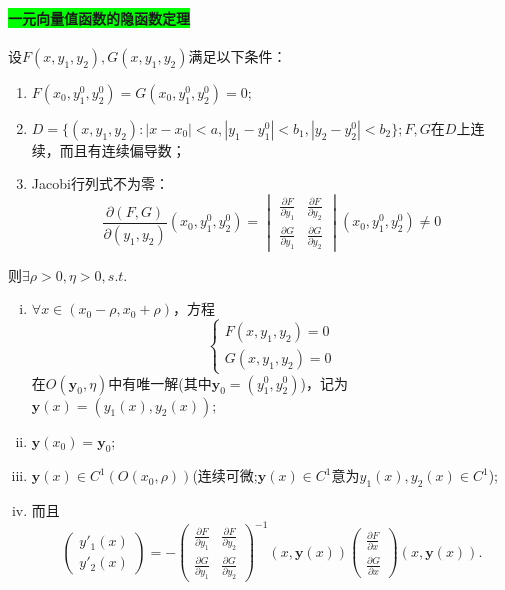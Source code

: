 \documentclass[UTF8]{ctexart}
\begin{document}
        \paragraph{\colorbox{lime}{一元向量值函数的隐函数定理}}设$F(x,y_1,y_2),G(x,y_1,y_2)$满足以下条件：
        \begin{enumerate}[(1)]
            \item $F(x_0,y_1^0,y_2^0)=G(x_0,y_1^0,y_2^0)=0$;
            \item $D=\{(x,y_1,y_2):|x-x_0|<a,|y_1-y_1^0|<b_1,|y_2-y_2^0|<b_2\};F,G$在$D$上连续，而且有连续偏导数；
            \item Jacobi行列式不为零：$$\frac{\partial(F,G)}{\partial(y_1,y_2)}(x_0,y_1^0,y_2^0)=\begin{vmatrix}
                \frac{\partial F}{\partial y_1} & \frac{\partial F}{\partial y_2}\\
                \frac{\partial G}{\partial y_1} & \frac{\partial G}{\partial y_2}
            \end{vmatrix}(x_0,y_1^0,y_2^0)\not=0$$
        \end{enumerate}
        则$\exists\rho>0,\eta>0,s.t.$
        \begin{enumerate}[(i)]
            \item $\forall x\in(x_0-\rho,x_0+\rho)$，方程
            $$\begin{cases}
                F(x,y_1,y_2)=0\\
                G(x,y_1,y_2)=0
            \end{cases}$$
            在$O(\boldsymbol{y}_0,\eta)$中有唯一解(其中$\boldsymbol{y}_0=(y_1^0,y_2^0)$)，记为$\boldsymbol{y}(x)=(y_1(x),y_2(x))$;
            \item $\boldsymbol{y}(x_0)=\boldsymbol{y}_0$;
            \item $\boldsymbol{y}(x)\in C^1(O(x_0,\rho))$(连续可微;$\boldsymbol{y}(x)\in C^1$意为$y_1(x),y_2(x)\in C^1$);
            \item 而且$$\begin{pmatrix}
                y'_1(x)\\
                y'_2(x)
            \end{pmatrix}=-\begin{pmatrix}
                \frac{\partial F}{\partial y_1} & \frac{\partial F}{\partial y_2}\\
                \frac{\partial G}{\partial y_1} & \frac{\partial G}{\partial y_2}
            \end{pmatrix}^{-1}(x,\boldsymbol{y}(x))\begin{pmatrix}
                \frac{\partial F}{\partial x}\\
                \frac{\partial G}{\partial x}
            \end{pmatrix}(x,\boldsymbol{y}(x)).$$
        \end{enumerate}
        
\end{document}
